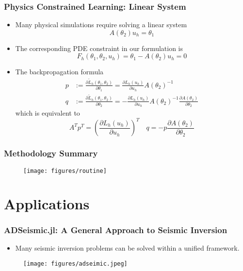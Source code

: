 \documentclass[usenames,dvipsnames]{beamer}
\begin{document}
\begin{frame}
	\frametitle{Physics Constrained Learning: Linear System}
	
	\begin{itemize}
		\item Many physical simulations require solving a linear system 
		$$A(\theta_2) u_h = \theta_1$$
		\item The corresponding PDE constraint in our formulation is  
		$$F_h(\theta_1,\theta_2, u_h) = \theta_1 - A(\theta_2)u_h = 0$$
		\item The backpropagation formula
		\begin{align*}
			p &:=\frac{\partial \tilde L_h(\theta_1, \theta_2)}{\partial \theta_1} = \frac{\partial L_h(u_h)}{\partial u_h}A(\theta_2)^{-1}\\
			q &:=\frac{\partial \tilde L_h(\theta_1, \theta_2)}{\partial \theta_2} = -\frac{\partial L_h(u_h)}{\partial u_h}A(\theta_2)^{-1} \frac{\partial A(\theta_2)}{\partial \theta_2}
		\end{align*}
		which is equivalent to 
		$$A^T p^T =\left( \frac{\partial  L_h(u_h)}{\partial u_h} \right)^T\quad q = -p\frac{\partial A(\theta_2)}{\partial \theta_2} $$
	\end{itemize}
	
\end{frame}

\begin{frame}
	\frametitle{Methodology Summary}
\begin{figure}[hbt]
\centering
  \texttt{[image: figures/routine]}
\end{figure}

\end{frame}


\section{Applications}


\begin{frame}
	\frametitle{ADSeismic.jl: A General Approach to Seismic Inversion}
	\begin{itemize}
		\item Many seismic inversion problems can be solved within a unified framework. 
	\end{itemize}
	\begin{figure}[hbt]
  \texttt{[image: figures/adseimic.jpeg]}
\end{figure}
	
\end{frame}
\end{document}

